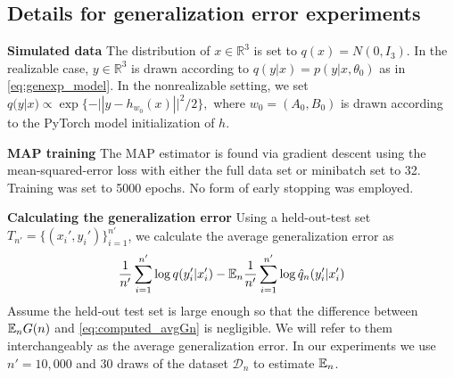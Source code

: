 \documentclass{article} %
\begin{document}
\subsection{Details for generalization error experiments}
\label{appendix:generalizaton}

\textbf{Simulated data}
The distribution of $x \in \mathbb R^3$ is set to $q(x)=N(0,I_3)$. 
In the realizable case, $y \in \mathbb R^3$ is drawn according to $q(y|x) = p(y|x,\theta_0)$ as in \eqref{eq:genexp_model}. In the nonrealizable setting, we set $q(y|x) \propto \exp\{-|| y - h_{w_0}(x) ||^2/2\},$ where $w_0 = (A_0,B_0)$ is drawn according to the PyTorch model initialization of $h$.


\textbf{MAP training}
The MAP estimator is found via gradient descent using the mean-squared-error loss with either the full data set or minibatch set to 32. Training was set to 5000 epochs. No form of early stopping was employed.

\textbf{Calculating the generalization error}
Using a held-out-test set $T_{n'} = \{(x_i',y_i')\}_{i=1}^{n'}$, we calculate the average generalization error as
\begin{equation}
\frac{1}{n'} \sum_{i=1}^{n'} \log q(y_i'|x_i') - {\mathbb{E}}_n \frac{1}{n'} \sum_{i=1}^{n'} \log \hat q_n(y_i'|x_i')
\label{eq:computed_avgGn}
\end{equation}
Assume the held-out test set is large enough so that the difference between ${\mathbb{E}}_n G(n)$ and \eqref{eq:computed_avgGn} is negligible. We will refer to them interchangeably as the average generalization error. In our experiments we use $n' = 10,000$ and $30$ draws of the dataset $\mathcal{D}_n$ to estimate ${\mathbb{E}}_n$.
\end{document}
